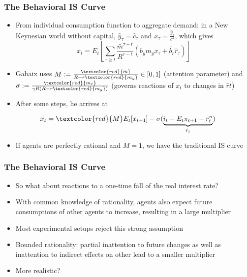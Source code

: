 \documentclass{beamer}
\begin{document}
\begin{frame}
	\frametitle{The Behavioral IS Curve}
	\begin{itemize}
		\item From individual consumption function to aggregate demand: in a New Keynesian world without capital, $\hat y_{\tau}=\hat c_{\tau}$ and $x_{\tau}=\frac {\hat y_{\tau}}{c^{d}}$, which gives
	$$x_{t}=E_{t}[\sum_{\tau \geq t}\frac{\bar m^{\tau-t}}{R^{\tau-t}}(b_{y}m_{y}x_{\tau}+\tilde{b_{r}}\hat r_{\tau})]$$
		\item Gabaix uses $M:=\frac{\textcolor{red}{\bar m}}{R-r\textcolor{red}{m_{y}}}\in [0,1]$ (attention parameter) and $\sigma:=\frac{\textcolor{red}{m_{r}}}{\gamma R(R-r\textcolor{red}{m_{y}})}$ (governs reactions of $x_{t}$ to changes in $\hat r{t}$)
		\item After some steps, he arrives at
	\end{itemize}

	$$x_{t}=\textcolor{red}{M}E_{t}[x_{t+1}]-\sigma(\underbrace{i_{t}-E_{t}\pi_{t+1}-r_{t}^{n}}_\text{$\hat r_{t}$})$$

	\begin{itemize}
		\item If agents are perfectly rational and $M=1$, we have the traditional IS curve
	\end{itemize}
\end{frame}


\begin{frame}
\frametitle{The Behavioral IS Curve}
\begin{itemize}
\item So what about reactions to a one-time fall of the real interest rate?
\item With common knowledge of rationality, agents also expect future consumptions of other agents to increase, resulting in a large multiplier
\item Most experimental setups reject this strong assumption
\item Bounded rationality: partial inattention to future changes as well as inattention to indirect effects on other lead to a smaller multiplier
\item More realistic?
\end{itemize}
\end{frame}

\end{document}
